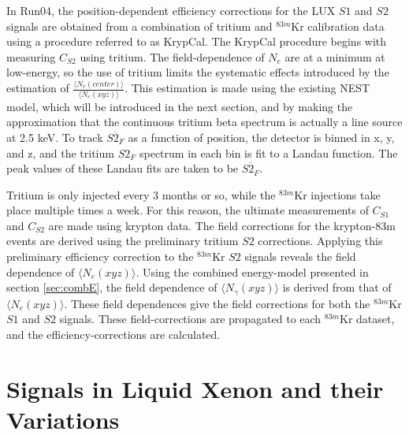 In Run04, the position-dependent efficiency corrections for the LUX $S1$ and $S2$ signals are obtained from a combination of tritium and $^{83m}$Kr calibration data using a procedure referred to as KrypCal\cite{richard}. The KrypCal procedure begins with measuring  $C_{S2}$ using tritium. The field-dependence of $N_{e}$ are at a minimum at low-energy, so the use of tritium limits the systematic effects introduced by the estimation of $\frac{\langle N_{e}(center)\rangle}{\langle N_{e}(xyz)\rangle}$. This estimation is made using the existing NEST model, which will be introduced in the next section, and by making the approximation that the continuous tritium beta spectrum is actually a line source at 2.5 keV. To track $\overline{S2_F}$ as a function of position, the detector is binned in x, y, and z, and the tritium $S2_F$ spectrum in each bin is fit to a Landau function. The peak values of these Landau fits are taken to be $\overline{S2_F}$.

Tritium is only injected every 3 months or so, while the $^{83m}$Kr injections take place multiple times a week. For this reason, the ultimate measurements of $C_{S1}$ and $C_{S2}$ are made using krypton data. The field corrections for the krypton-83m events are derived using the preliminary tritium $S2$ corrections. Applying this preliminary efficiency correction to the $^{83m}$Kr $S2$ signals reveals the field dependence of $\langle N_{e}(xyz)\rangle$. Using the combined energy-model presented in section \ref{sec:combE}, the field dependence of $\langle N_{\gamma}(xyz)\rangle$ is derived from that of $\langle N_{e}(xyz)\rangle$. These field dependences give the field corrections for both the $^{83m}$Kr $S1$ and $S2$ signals. These field-corrections are propagated to each $^{83m}$Kr dataset, and the efficiency-corrections are calculated.

\section{Signals in Liquid Xenon and their Variations}
